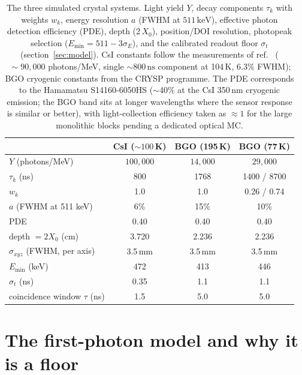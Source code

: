 \documentclass[11pt,a4paper]{article}
\newcommand{\ns}{\,\mathrm{ns}}
\newcommand{\keV}{\,\mathrm{keV}}
\begin{document}
\begin{table}[ht]
\centering
\caption{The three simulated crystal systems. Light yield $Y$, decay components
$\tau_k$ with weights $w_k$, energy resolution $a$ (FWHM at $511\keV$), effective photon
detection efficiency (PDE), depth (2\,$X_0$), position/DOI resolution, photopeak selection
($E_{\mathrm{min}} = 511 - 3\sigma_E$), and the calibrated readout floor $\sigma_t$
(section~\ref{sec:model}). CsI constants follow the measurements of ref.~\cite{Soleti2024}
($\,{\sim}90{,}000$ photons/MeV, single ${\sim}800\ns$ component at 104\,K, $6.3\%$ FWHM);
BGO cryogenic constants from the CRYSP programme. The PDE corresponds to the Hamamatsu
S14160-6050HS ($\sim$40\% at the CsI 350\,nm cryogenic emission; the BGO band sits at longer
wavelengths where the sensor response is similar or better), with light-collection efficiency
taken as ${\approx}1$ for the large monolithic blocks pending a dedicated optical MC.}
\label{tab:systems}
\vspace{2mm}
\begin{tabular}{lccc}
\toprule
 & CsI (${\sim}100$\,K) & BGO (195\,K) & BGO (77\,K) \\
\midrule
$Y$ (photons/MeV)            & $100{,}000$   & $14{,}000$ & $29{,}000$ \\
$\tau_k$ (ns)                & 800           & 1768       & 1400 / 8700 \\
$w_k$                        & 1.0           & 1.0        & 0.26 / 0.74 \\
$a$ (FWHM at 511 keV)        & 6\%           & 15\%       & 10\% \\
PDE                          & 0.40          & 0.40       & 0.40 \\
depth $= 2X_0$ (cm)          & 3.720         & 2.236      & 2.236 \\
$\sigma_{xyz}$ (FWHM, per axis) & 3.5\,mm    & 3.5\,mm    & 3.5\,mm \\
$E_{\mathrm{min}}$ (keV)     & 472           & 413        & 446 \\
$\sigma_t$ (ns)              & 0.35          & 1.1        & 1.1 \\
coincidence window $\tau$ (ns) & 1.5         & 5.0        & 5.0 \\
\bottomrule
\end{tabular}
\end{table}

\section{The first-photon model and why it is a floor}
\label{sec:firstphoton}
\end{document}
